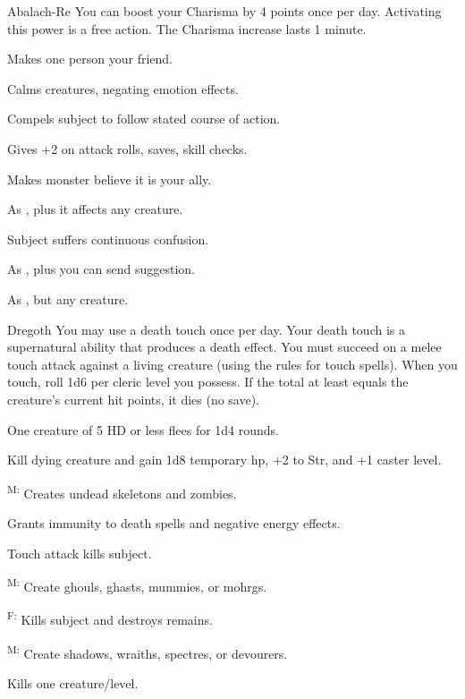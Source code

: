 {Abalach-Re}
{You can boost your Charisma by 4 points once per day. Activating this power is a free action. The Charisma increase lasts 1 minute.}
{
	\item {} Makes one person your friend.
	\item {} Calms creatures, negating emotion effects.
	\item {} Compels subject to follow stated course of action.
	\item {} Gives +2 on attack rolls, saves, skill checks.
	\item {} Makes monster believe it is your ally.
	\item {} As , plus it affects any creature.
	\item {} Subject suffers continuous confusion.
	\item {} As , plus you can send suggestion.
	\item {} As , but any creature.
}

{Dregoth}
{You may use a death touch once per day. Your death touch is a supernatural ability that produces a death effect. You must succeed on a melee touch attack against a living creature (using the rules for touch spells). When you touch, roll 1d6 per cleric level you possess. If the total at least equals the creature's current hit points, it dies (no save).}
{
	\item {} One creature of 5 HD or less flees for 1d4 rounds.
	\item {} Kill dying creature and gain 1d8 temporary hp, +2 to Str, and +1 caster level.
	\item {}\textsuperscript{M:} Creates undead skeletons and zombies.
	\item {} Grants immunity to death spells and negative energy effects.
	\item {} Touch attack kills subject.
	\item {}\textsuperscript{M:} Create ghouls, ghasts, mummies, or mohrgs.
	\item {}\textsuperscript{F:} Kills subject and destroys remains.
	\item {}\textsuperscript{M:} Create shadows, wraiths, spectres, or devourers.
	\item {} Kills one creature/level.
}

